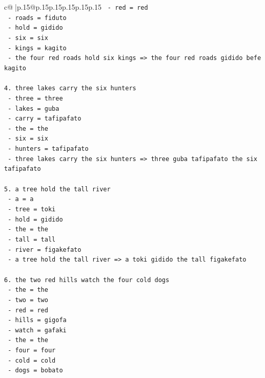 \documentclass{article}
\begin{document}
{\begin{supertabular}{c@{$\;$}|p{.15\linewidth}@{}p{.15\linewidth}p{.15\linewidth}p{.15\linewidth}p{.15\linewidth}p{.15\linewidth}}
{{{\texttt{   {-} red = red} \\
\texttt{   {-} roads = fiduto} \\
\texttt{   {-} hold = gidido} \\
\texttt{   {-} six = six} \\
\texttt{   {-} kings = kagito} \\
\texttt{   {-} the four red roads hold six kings => the four red roads gidido befe kagito} \\
\\ 
\texttt{4. three lakes carry the six hunters} \\
\texttt{   {-} three = three} \\
\texttt{   {-} lakes = guba} \\
\texttt{   {-} carry = tafipafato} \\
\texttt{   {-} the = the} \\
\texttt{   {-} six = six} \\
\texttt{   {-} hunters = tafipafato} \\
\texttt{   {-} three lakes carry the six hunters => three guba tafipafato the six tafipafato} \\
\\ 
\texttt{5. a tree hold the tall river} \\
\texttt{   {-} a = a} \\
\texttt{   {-} tree = toki} \\
\texttt{   {-} hold = gidido} \\
\texttt{   {-} the = the} \\
\texttt{   {-} tall = tall} \\
\texttt{   {-} river = figakefato} \\
\texttt{   {-} a tree hold the tall river => a toki gidido the tall figakefato} \\
\\ 
\texttt{6. the two red hills watch the four cold dogs} \\
\texttt{   {-} the = the} \\
\texttt{   {-} two = two} \\
\texttt{   {-} red = red} \\
\texttt{   {-} hills = gigofa} \\
\texttt{   {-} watch = gafaki} \\
\texttt{   {-} the = the} \\
\texttt{   {-} four = four} \\
\texttt{   {-} cold = cold} \\
\texttt{   {-} dogs = bobato} \\
}}}
\end{supertabular}}
\end{document}
